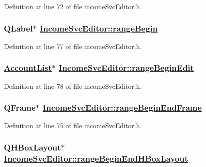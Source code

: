 Definition at line 72 of file income\-Svc\-Editor.h.\hypertarget{classIncomeSvcEditor_r20}{
\subsubsection[rangeBegin]{\setlength{\rightskip}{0pt plus 5cm}QLabel$\ast$ \hyperlink{classIncomeSvcEditor_r20}{Income\-Svc\-Editor::range\-Begin}}}
\label{classIncomeSvcEditor_r20}


Definition at line 77 of file income\-Svc\-Editor.h.\hypertarget{classIncomeSvcEditor_r21}{
\subsubsection[rangeBeginEdit]{\setlength{\rightskip}{0pt plus 5cm}\hyperlink{classAccountList}{Account\-List}$\ast$ \hyperlink{classIncomeSvcEditor_r21}{Income\-Svc\-Editor::range\-Begin\-Edit}}}
\label{classIncomeSvcEditor_r21}


Definition at line 78 of file income\-Svc\-Editor.h.\hypertarget{classIncomeSvcEditor_r18}{
\subsubsection[rangeBeginEndFrame]{\setlength{\rightskip}{0pt plus 5cm}QFrame$\ast$ \hyperlink{classIncomeSvcEditor_r18}{Income\-Svc\-Editor::range\-Begin\-End\-Frame}}}
\label{classIncomeSvcEditor_r18}


Definition at line 75 of file income\-Svc\-Editor.h.\hypertarget{classIncomeSvcEditor_r19}{
\subsubsection[rangeBeginEndHBoxLayout]{\setlength{\rightskip}{0pt plus 5cm}QHBox\-Layout$\ast$ \hyperlink{classIncomeSvcEditor_r19}{Income\-Svc\-Editor::range\-Begin\-End\-HBox\-Layout}}}
\label{classIncomeSvcEditor_r19}


